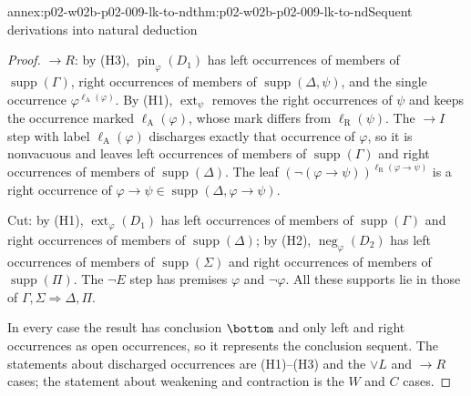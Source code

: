 \begin{annexitem}{annex:p02-w02b-p02-009-lk-to-nd}{thm:p02-w02b-p02-009-lk-to-nd}{Sequent derivations into natural deduction}
\begin{proof}
\(\to R\): by (H3), \(\operatorname{pin}_\varphi(D_1)\) has left occurrences
of members of \(\operatorname{supp}(\Gamma)\), right occurrences of members
of \(\operatorname{supp}(\Delta,\psi)\), and the single occurrence
\(\varphi^{\ell_{\mathrm A}(\varphi)}\).  By (H1),
\(\operatorname{ext}_\psi\) removes the right occurrences of \(\psi\) and
keeps the occurrence marked \(\ell_{\mathrm A}(\varphi)\), whose mark differs
from \(\ell_{\mathrm R}(\psi)\).  The \(\to I\) step with label
\(\ell_{\mathrm A}(\varphi)\) discharges exactly that occurrence of
\(\varphi\), so it is nonvacuous and leaves left occurrences of members of
\(\operatorname{supp}(\Gamma)\) and right occurrences of members of
\(\operatorname{supp}(\Delta)\).  The leaf
\((\neg(\varphi\to\psi))^{\ell_{\mathrm R}(\varphi\to\psi)}\) is a right
occurrence of \(\varphi\to\psi\in\operatorname{supp}(\Delta,\varphi\to\psi)\).

Cut: by (H1), \(\operatorname{ext}_\varphi(D_1)\) has left occurrences of
members of \(\operatorname{supp}(\Gamma)\) and right occurrences of members
of \(\operatorname{supp}(\Delta)\); by (H2), \(\operatorname{neg}_\varphi(D_2)\)
has left occurrences of members of \(\operatorname{supp}(\Sigma)\) and right
occurrences of members of \(\operatorname{supp}(\Pi)\).  The \(\neg E\) step
has premises \(\varphi\) and \(\neg\varphi\).  All these supports lie in those
of \(\Gamma,\Sigma\Rightarrow\Delta,\Pi\).

In every case the result has conclusion \(\bottom\) and only left and right
occurrences as open occurrences, so it represents the conclusion sequent.
The statements about discharged occurrences are (H1)--(H3) and the
\(\lor L\) and \(\to R\) cases; the statement about weakening and
contraction is the \(W\) and \(C\) cases.
\end{proof}
\end{annexitem}

